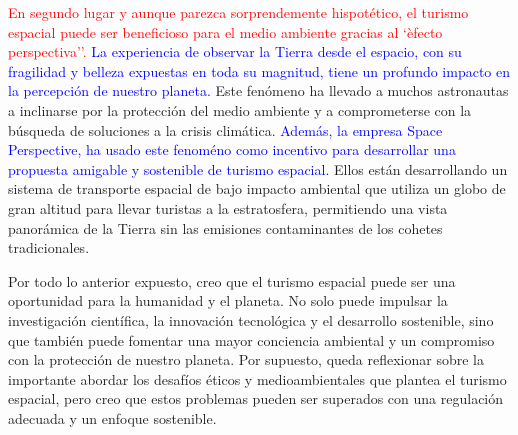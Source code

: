 \documentclass{article}
\begin{document}
\textcolor{red}{En segundo lugar y aunque parezca sorprendemente hispotético, el turismo espacial puede ser beneficioso para el medio ambiente gracias al `èfecto perspectiva''.} \textcolor{blue}{La experiencia de observar la Tierra desde el espacio, con su fragilidad y belleza expuestas en toda su magnitud, tiene un profundo impacto en la percepción de nuestro planeta.} \textcolor{OliveGreen}{Este fenómeno ha llevado a muchos astronautas a inclinarse por la protección del medio ambiente y a comprometerse con la búsqueda de soluciones a la crisis climática.} \textcolor{blue}{Además, la empresa Space Perspective, ha usado este fenoméno como incentivo para desarrollar una propuesta amigable y sostenible de turismo espacial.} \textcolor{OliveGreen}{Ellos están desarrollando un sistema de transporte espacial de bajo impacto ambiental que utiliza un globo de gran altitud para llevar turistas a la estratosfera, permitiendo una vista panorámica de la Tierra sin las emisiones contaminantes de los cohetes tradicionales.}

Por todo lo anterior expuesto, creo que el turismo espacial puede ser una oportunidad para la humanidad y el planeta. No solo puede impulsar la investigación científica, la innovación tecnológica y el desarrollo sostenible, sino que también puede fomentar una mayor conciencia ambiental y un compromiso con la protección de nuestro planeta. Por supuesto, queda reflexionar sobre la importante abordar los desafíos éticos y medioambientales que plantea el turismo espacial, pero creo que estos problemas pueden ser superados con una regulación adecuada y un enfoque sostenible.
  
\end{document}
